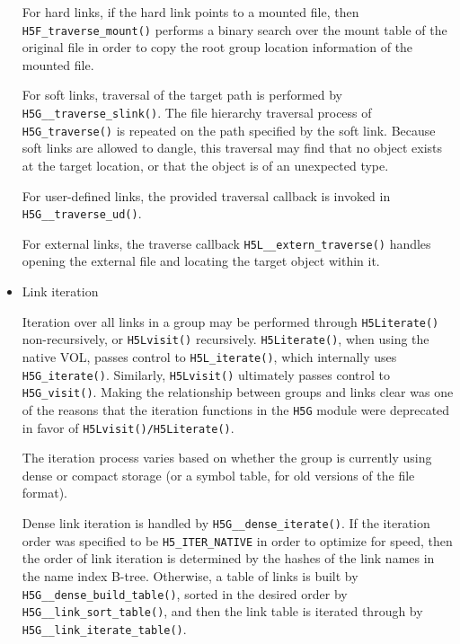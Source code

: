 \begin{itemize}
For hard links, if the hard link points to a mounted file, then \texttt{H5F\_traverse\_mount()} performs a binary search over the mount table of the original file in order to copy the root group location information of the mounted file. 

For soft links, traversal of the target path is performed by \texttt{H5G\_\_traverse\_slink()}. The file hierarchy traversal process of \texttt{H5G\_traverse()} is repeated on the path specified by the soft link. Because soft links are allowed to dangle, this traversal may find that no object exists at the target location, or that the object is of an unexpected type.

For user-defined links, the provided traversal callback is invoked in \texttt{H5G\_\_traverse\_ud()}. 

For external links, the traverse callback \texttt{H5L\_\_extern\_traverse()} handles opening the external file and locating the target object within it.

    \item Link iteration

Iteration over all links in a group may be performed through \texttt{H5Literate()} non-recursively, or \texttt{H5Lvisit()} recursively. \texttt{H5Literate()}, when using the native VOL, passes control to \texttt{H5L\_iterate()}, which internally uses \texttt{H5G\_iterate()}. Similarly, \texttt{H5Lvisit()} ultimately passes control to \texttt{H5G\_visit()}. Making the relationship between groups and links clear was one of the reasons that the iteration functions in the \texttt{H5G} module were deprecated in favor of \texttt{H5Lvisit()/H5Literate()}. 

The iteration process varies based on whether the group is currently using dense or compact storage (or a symbol table, for old versions of the file format). 

Dense link iteration is handled by \texttt{H5G\_\_dense\_iterate()}. If the iteration order was specified to be \texttt{H5\_ITER\_NATIVE} in order to optimize for speed, then the order of link iteration is determined by the hashes of the link names in the name index B-tree. Otherwise, a table of links is built by \texttt{H5G\_\_dense\_build\_table()}, sorted in the desired order by \texttt{H5G\_\_link\_sort\_table()}, and then the link table is iterated through by \texttt{H5G\_\_link\_iterate\_table()}. %


\end{itemize}

